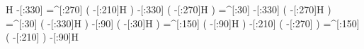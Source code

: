             H%
     -[:330]%
    =^[:270]%
               (
         -[:210]H%
               )
     -[:330]%
               (
         -[:270]H%
               )
     =^[:30]%
     -[:330]%
               (
         -[:270]H%
               )
     =^[:30]%
               (
         -[:330]H%
               )
      -[:90]%
               (
          -[:30]H%
               )
    =^[:150]%
               (
          -[:90]H%
               )
     -[:210]%
               (
         -[:270]%
               )
    =^[:150]%
               (
         -[:210]%
               )
      -[:90]H%